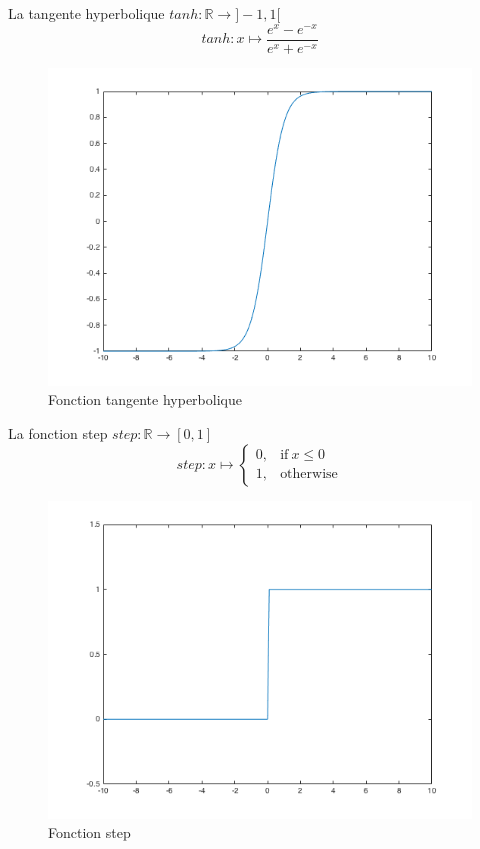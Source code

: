 \documentclass{article}
\begin{document}
La tangente hyperbolique $tanh : \mathbb{R} \rightarrow ]-1, 1[$
\begin{equation}
	tanh : x \mapsto \frac{e^x - e^{-x}}{e^x + e^{-x}}
\end{equation}

\begin{figure}[H]
\begin{center}
	\includegraphics[scale=0.4]{tanh.png} 
	\caption{Fonction tangente hyperbolique}
\end{center}
\end{figure}

La fonction step $step : \mathbb{R} \rightarrow [0, 1]$
\begin{equation}
	step : x \mapsto
		\begin{cases}
			0, & \text{if}\ x \leq 0\\
			1, & \text{otherwise}
		\end{cases}
\end{equation}

\begin{figure}[H]
\begin{center}
	\includegraphics[scale=0.4]{step.png} 
	\caption{Fonction step}
\end{center}
\end{figure}
\end{document}
